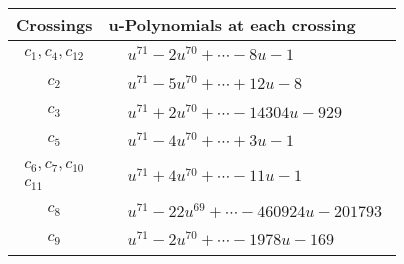 \documentclass[1p]{elsarticle_modified}
\theoremstyle{definition}
\begin{document}
\begin{tabular}{m{50pt}|m{274pt}}
Crossings & \hspace{64pt}u-Polynomials at each crossing \\
\hline $$\begin{aligned}c_{1},c_{4},c_{12}\end{aligned}$$&$\begin{aligned}
&u^{71}-2 u^{70}+\cdots-8 u-1
\end{aligned}$\\
\hline $$\begin{aligned}c_{2}\end{aligned}$$&$\begin{aligned}
&u^{71}-5 u^{70}+\cdots+12 u-8
\end{aligned}$\\
\hline $$\begin{aligned}c_{3}\end{aligned}$$&$\begin{aligned}
&u^{71}+2 u^{70}+\cdots-14304 u-929
\end{aligned}$\\
\hline $$\begin{aligned}c_{5}\end{aligned}$$&$\begin{aligned}
&u^{71}-4 u^{70}+\cdots+3 u-1
\end{aligned}$\\
\hline $$\begin{aligned}c_{6},c_{7},c_{10}\\c_{11}\end{aligned}$$&$\begin{aligned}
&u^{71}+4 u^{70}+\cdots-11 u-1
\end{aligned}$\\
\hline $$\begin{aligned}c_{8}\end{aligned}$$&$\begin{aligned}
&u^{71}-22 u^{69}+\cdots-460924 u-201793
\end{aligned}$\\
\hline $$\begin{aligned}c_{9}\end{aligned}$$&$\begin{aligned}
&u^{71}-2 u^{70}+\cdots-1978 u-169
\end{aligned}$\\
\hline
\end{tabular}\\~\\
\end{document}
